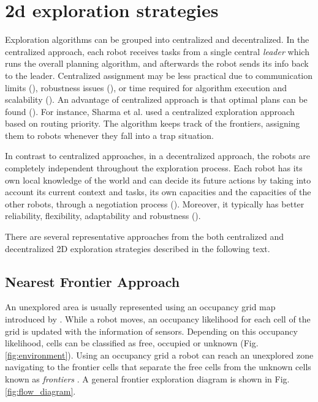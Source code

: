 \section{2d exploration strategies}

Exploration algorithms can be grouped into centralized and decentralized. In the  centralized approach, each robot receives tasks from a single central \emph{leader} which runs the overall planning algorithm, and afterwards the robot sends its info back to the leader. Centralized assignment may be less practical due to communication limits (\cite{Dias2000}), robustness issues (\cite{Dias2006}), or time required for algorithm execution and scalability (\cite{Julia2012}). An advantage of centralized approach is that optimal plans can be found (\cite{Yan2011}). For instance, Sharma et al. \cite{SharmaHonc2016} used a centralized exploration approach based on routing priority. The algorithm keeps track of the frontiers, assigning them to robots  whenever they fall into a trap situation.

In contrast to centralized approaches, in a decentralized approach, the robots are completely independent throughout the exploration process. Each robot has its own local knowledge of the world and can decide its future actions by taking into account its current context and tasks, its own capacities and the capacities of the other robots, through a negotiation process (\cite{Yan2013}). Moreover, it typically has better reliability, flexibility, adaptability and robustness (\cite{Zlot2002}). 
 
There are several representative approaches from the both centralized and decentralized 2D exploration strategies described in the following text. 


\subsection{Nearest Frontier Approach} 

An unexplored area is usually represented using an occupancy grid map introduced by \cite{Moravec}. While a robot moves, an occupancy likelihood for each cell of the grid is updated with the information of sensors. Depending on this occupancy likelihood, cells can be classified as free, occupied or unknown (Fig. \ref{fig:environment}). Using an occupancy grid a robot can reach an unexplored zone navigating to the frontier cells that separate the free cells from the unknown cells known as \textit{frontiers} \cite{Yamauchi1997}. A general frontier exploration diagram is shown in Fig. \ref{fig:flow_diagram}.

